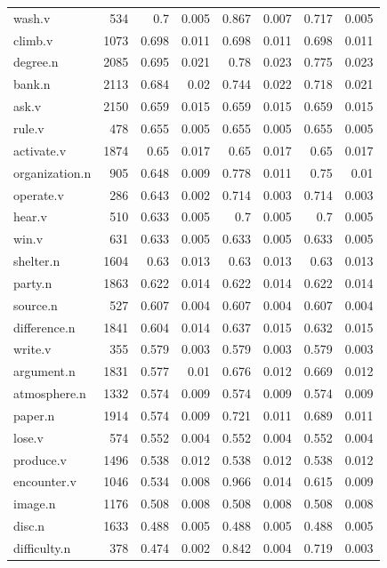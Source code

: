 \documentclass{article}
\begin{document}
\begin{longtable}{l | r r r r r r r}
wash.v	&	534	&	0.7	&	0.005	&	0.867	&	0.007	&	0.717	&	0.005\\
climb.v	&	1073	&	0.698	&	0.011	&	0.698	&	0.011	&	0.698	&	0.011\\
degree.n	&	2085	&	0.695	&	0.021	&	0.78	&	0.023	&	0.775	&	0.023\\
bank.n	&	2113	&	0.684	&	0.02	&	0.744	&	0.022	&	0.718	&	0.021\\
ask.v	&	2150	&	0.659	&	0.015	&	0.659	&	0.015	&	0.659	&	0.015\\
rule.v	&	478	&	0.655	&	0.005	&	0.655	&	0.005	&	0.655	&	0.005\\
activate.v	&	1874	&	0.65	&	0.017	&	0.65	&	0.017	&	0.65	&	0.017\\
organization.n	&	905	&	0.648	&	0.009	&	0.778	&	0.011	&	0.75	&	0.01\\
operate.v	&	286	&	0.643	&	0.002	&	0.714	&	0.003	&	0.714	&	0.003\\
hear.v	&	510	&	0.633	&	0.005	&	0.7	&	0.005	&	0.7	&	0.005\\
win.v	&	631	&	0.633	&	0.005	&	0.633	&	0.005	&	0.633	&	0.005\\
shelter.n	&	1604	&	0.63	&	0.013	&	0.63	&	0.013	&	0.63	&	0.013\\
party.n	&	1863	&	0.622	&	0.014	&	0.622	&	0.014	&	0.622	&	0.014\\
source.n	&	527	&	0.607	&	0.004	&	0.607	&	0.004	&	0.607	&	0.004\\
difference.n	&	1841	&	0.604	&	0.014	&	0.637	&	0.015	&	0.632	&	0.015\\
write.v	&	355	&	0.579	&	0.003	&	0.579	&	0.003	&	0.579	&	0.003\\
argument.n	&	1831	&	0.577	&	0.01	&	0.676	&	0.012	&	0.669	&	0.012\\
atmosphere.n	&	1332	&	0.574	&	0.009	&	0.574	&	0.009	&	0.574	&	0.009\\
paper.n	&	1914	&	0.574	&	0.009	&	0.721	&	0.011	&	0.689	&	0.011\\
lose.v	&	574	&	0.552	&	0.004	&	0.552	&	0.004	&	0.552	&	0.004\\
produce.v	&	1496	&	0.538	&	0.012	&	0.538	&	0.012	&	0.538	&	0.012\\
encounter.v	&	1046	&	0.534	&	0.008	&	0.966	&	0.014	&	0.615	&	0.009\\
image.n	&	1176	&	0.508	&	0.008	&	0.508	&	0.008	&	0.508	&	0.008\\
disc.n	&	1633	&	0.488	&	0.005	&	0.488	&	0.005	&	0.488	&	0.005\\
difficulty.n	&	378	&	0.474	&	0.002	&	0.842	&	0.004	&	0.719	&	0.003\\

\end{longtable}
\end{document}
